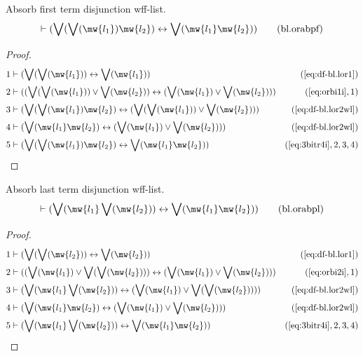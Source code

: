 \begin{lemma} Absorb first term disjunction wff-list.
\begin{align}
\vdash ( \bigvee( \bigvee( \mw{l_1} ) \mw{l_2} ) \leftrightarrow \bigvee(
    \mw{l_1} \mw{l_2} ) )\label{eq:bl.orabpf}\tag{bl.orabpf}
\end{align}
\end{lemma}

\begin{proof}
\begin{align}
  1 & \vdash ( \bigvee( \bigvee( \mw{l_1} ) ) \leftrightarrow \bigvee(
    \mw{l_1} ) )&(\mbox{\ref{eq:df-bl.lor1}})\notag
  \\ 2 & \vdash ( ( \bigvee( \bigvee( \mw{l_1} ) ) \vee \bigvee( \mw{l_2} )
    ) \leftrightarrow ( \bigvee( \mw{l_1} ) \vee \bigvee(
    \mw{l_2} ) ) )&(\mbox{\ref{eq:orbi1i}},1)\notag
  \\ 3 & \vdash ( \bigvee( \bigvee( \mw{l_1} ) \mw{l_2} ) \leftrightarrow (
    \bigvee( \bigvee( \mw{l_1} ) ) \vee \bigvee( \mw{l_2}
    ) ) )&(\mbox{\ref{eq:df-bl.lor2wl}})\notag
  \\ 4 & \vdash ( \bigvee( \mw{l_1} \mw{l_2} ) \leftrightarrow ( \bigvee(
    \mw{l_1} ) \vee \bigvee( \mw{l_2} ) )
    )&(\mbox{\ref{eq:df-bl.lor2wl}})\notag
  \\ 5 & \vdash ( \bigvee( \bigvee( \mw{l_1} ) \mw{l_2} ) \leftrightarrow
    \bigvee( \mw{l_1} \mw{l_2} )
    )&(\mbox{\ref{eq:3bitr4i}},2,3,4)\notag
\end{align}
\end{proof}

\begin{lemma} Absorb last term disjunction wff-list.
\begin{align}
\vdash ( \bigvee( \mw{l_1} \bigvee( \mw{l_2} ) ) \leftrightarrow \bigvee(
    \mw{l_1} \mw{l_2} ) )\label{eq:bl.orabpl}\tag{bl.orabpl}
\end{align}
\end{lemma}

\begin{proof}
\begin{align}
  1 & \vdash ( \bigvee( \bigvee( \mw{l_2} ) ) \leftrightarrow \bigvee(
    \mw{l_2} ) )&(\mbox{\ref{eq:df-bl.lor1}})\notag
  \\ 2 & \vdash ( ( \bigvee( \mw{l_1} ) \vee \bigvee( \bigvee( \mw{l_2} ) )
    ) \leftrightarrow ( \bigvee( \mw{l_1} ) \vee \bigvee(
    \mw{l_2} ) ) )&(\mbox{\ref{eq:orbi2i}},1)\notag
  \\ 3 & \vdash ( \bigvee( \mw{l_1} \bigvee( \mw{l_2} ) ) \leftrightarrow (
    \bigvee( \mw{l_1} ) \vee \bigvee( \bigvee( \mw{l_2} )
    ) ) )&(\mbox{\ref{eq:df-bl.lor2wl}})\notag
  \\ 4 & \vdash ( \bigvee( \mw{l_1} \mw{l_2} ) \leftrightarrow ( \bigvee(
    \mw{l_1} ) \vee \bigvee( \mw{l_2} ) )
    )&(\mbox{\ref{eq:df-bl.lor2wl}})\notag
  \\ 5 & \vdash ( \bigvee( \mw{l_1} \bigvee( \mw{l_2} ) ) \leftrightarrow
    \bigvee( \mw{l_1} \mw{l_2} )
    )&(\mbox{\ref{eq:3bitr4i}},2,3,4)\notag
\end{align}
\end{proof}


